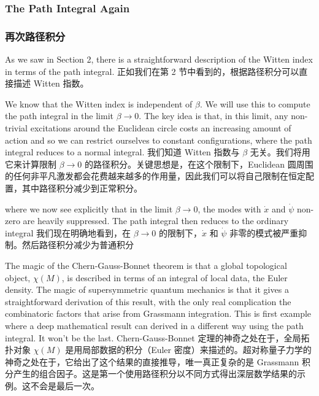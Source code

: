 \documentclass{article}
\begin{document}
\begin{paracol}{2}
\subsubsection{The Path Integral Again}
\switchcolumn
\subsubsection*{再次路径积分}
\switchcolumn*

As we saw in Section 2, there is a straightforward description of the Witten index in terms of the path integral.
\switchcolumn
正如我们在第 2 节中看到的，根据路径积分可以直接描述 Witten 指数。
\switchcolumn*

We know that the Witten index is independent of $\beta$. We will use this to compute the path integral in the limit $\beta \to 0$. The key idea is that, in this limit, any non-trivial excitations around the Euclidean circle costs an increasing amount of action and so we can restrict ourselves to constant configurations, where the path integral reduces to a normal integral.
\switchcolumn
我们知道 Witten 指数与 $\beta$ 无关。我们将用它来计算限制 $\beta \to 0$ 的路径积分。关键思想是，在这个限制下，Euclidean 圆周围的任何非平凡激发都会花费越来越多的作用量，因此我们可以将自己限制在恒定配置，其中路径积分减少到正常积分。
\switchcolumn*

where we now see explicitly that in the limit $\beta \to 0$, the modes with $\dot{x}$ and $\dot{\psi}$ non-zero are heavily suppressed. The path integral then reduces to the ordinary integral
\switchcolumn
我们现在明确地看到，在 $\beta \to 0$ 的限制下，$\dot{x}$ 和 $\dot{\psi}$ 非零的模式被严重抑制。然后路径积分减少为普通积分
\switchcolumn*

The magic of the Chern-Gauss-Bonnet theorem is that a global topological object, $\chi(M)$, is described in terms of an integral of local data, the Euler density. The magic of supersymmetric quantum mechanics is that it gives a straightforward derivation of this result, with the only real complication the combinatoric factors that arise from Grassmann integration. This is first example where a deep mathematical result can derived in a different way using the path integral. It won’t be the last.
\switchcolumn
Chern-Gauss-Bonnet 定理的神奇之处在于，全局拓扑对象 $\chi(M)$ 是用局部数据的积分（Euler 密度）来描述的。超对称量子力学的神奇之处在于，它给出了这个结果的直接推导，唯一真正复杂的是 Grassmann 积分产生的组合因子。这是第一个使用路径积分以不同方式得出深层数学结果的示例。这不会是最后一次。
\switchcolumn*


\end{paracol}
\end{document}
